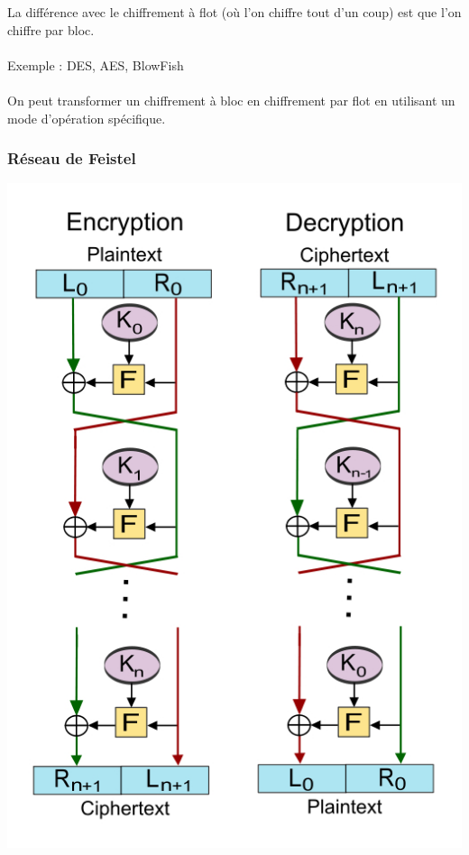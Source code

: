\documentclass{beamer}
\begin{document}
    \begin{frame}
        La différence avec le chiffrement à flot (où l'on chiffre tout d'un coup) est que l'on chiffre par bloc. \\~\\

        Exemple : DES, AES, BlowFish \\~\\

        On peut transformer un chiffrement à bloc en chiffrement par flot en utilisant un mode d'opération spécifique.
    \end{frame}

    \begin{frame}
    \frametitle{Réseau de Feistel}

    \begin{center} \includegraphics[scale=0.33]{figures/feistel.jpg} \end{center}

    \end{frame}
\end{document}
